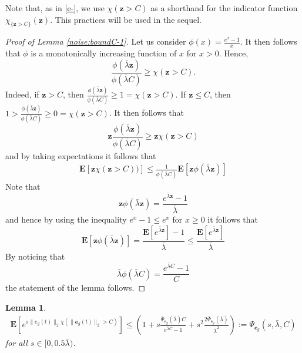 \documentclass{article}
\def\rve{{\mathbf{e}}}
\newtheorem{lemma}[theorem]{Lemma}
\newcommand{\e}{\mathbf{e}}
\newcommand{\z}{\mathbf{z}}
\newcommand{\bE}{\mathbf{E}}
\begin{document}
Note that, as in \eqref{e-}, we use $\chi(\z > C)$ as a shorthand for the indicator function $\chi_{\{\z > C\}}(\z)$. This practices will be used in the sequel.
\begin{proof}[Proof of Lemma \ref{noise:boundC-1}]
  Let us consider $\phi(x)=\frac{e^x-1}{x}$. It then follows
  that $\phi$ is a monotonically increasing function of $x$ for $x > 0$.
  Hence, 
  \[ 
    \frac{\phi(\bar{\lambda} \z)}{\phi(\bar{\lambda}C)} \ge  \chi(\z > C).
  \]
   Indeed, if $\z > C$, then 
   $\frac{\phi(\bar{\lambda} \z)}{\phi(\bar{\lambda}C)} \ge 1 = \chi(\z > C)$. If $\z \le  C$, then 
   $1 > \frac{\phi(\bar{\lambda} \z)}{\phi(\bar{\lambda}C)} \ge 0  = \chi(\z > C)$. 
   It then follows that 
   \[ 
      \z  \frac{\phi(\bar{\lambda} \z)}{\phi(\bar{\lambda}C)} \ge \z \chi(\z > C)
   \]
  and by taking expectations it follows that
  \[
     \begin{aligned}
       \bE[\z \chi(\z > C))] \le
       \frac{1}{\phi(\bar{\lambda}C)} \bE[\z \phi(\bar{\lambda} \z)]
     \end{aligned}  
  \]
  Note that
  \[
     \z \phi(\bar{\lambda} \z)=\frac{e^{\bar{\lambda} \z}-1}{\bar{\lambda}}
  \]
  and hence by using the inequality $e^x-1 \le e^{x}$ for $x \ge 0$ it follows that
  \[ 
     \bE[\z \phi(\bar{\lambda} \z)]=\frac{\bE[e^{\bar{\lambda} \z}]-1}{\bar{\lambda}} \le \frac{\bE[e^{\bar{\lambda} \z}]}{\bar{\lambda}}
  \]
  By noticing that
  \[
     \bar{\lambda}\phi(\bar{\lambda}C)=\frac{e^{\bar{\lambda}C}-1}{ C}
  \]
  the statement of the lemma follows. 
  \end{proof}
\begin{lemma}
\label{noise:boundC}
\begin{align*} 
     \bE[e^{s \|e_g(t)\|_2 \chi(\|\e_g(t)\|_2 > C)}]
     \le 
     \left(1+ s 
         \frac{\bar{\Psi}_{\rve_g}(\bar{\lambda})C}{e^{\bar{\lambda}C}-1} + s^2
         \frac{2\bar{\Psi}_{\rve_g}(\bar{\lambda})}{\bar{\lambda}^2}\right):=\Psi_{\rve_g}(s,\bar{\lambda},C)
 \end{align*}
 for all $s \in [0,0.5\bar{\lambda})$. 
\end{lemma}
\end{document}
